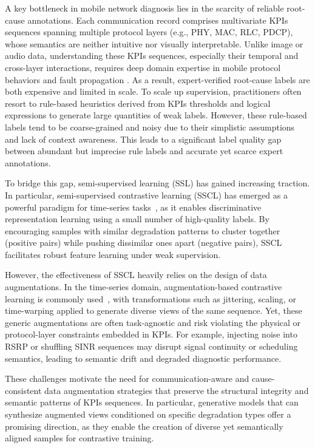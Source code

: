 \documentclass[lettersize,journal]{IEEEtran}
\begin{document}
A key bottleneck in mobile network diagnosis lies in the scarcity of reliable root-cause annotations. Each communication record comprises multivariate KPIs sequences spanning multiple protocol layers (e.g., PHY, MAC, RLC, PDCP), whose semantics are neither intuitive nor visually interpretable. Unlike image or audio data, understanding these KPIs sequences, especially their temporal and cross-layer interactions, requires deep domain expertise in mobile protocol behaviors and fault propagation \cite{chen2024overview}. As a result, expert-verified root-cause labels are both expensive and limited in scale.
To scale up supervision, practitioners often resort to rule-based heuristics derived from KPIs thresholds and logical expressions to generate large quantities of weak labels. However, these rule-based labels tend to be coarse-grained and noisy due to their simplistic assumptions and lack of context awareness. This leads to a significant label quality gap between abundant but imprecise rule labels and accurate yet scarce expert annotations.

To bridge this gap, semi-supervised learning (SSL) has gained increasing traction. In particular, semi-supervised contrastive learning (SSCL) has emerged as a powerful paradigm for time-series tasks~\cite{zhang2024self}, as it enables discriminative representation learning using a small number of high-quality labels. By encouraging samples with similar degradation patterns to cluster together (positive pairs) while pushing dissimilar ones apart (negative pairs), SSCL facilitates robust feature learning under weak supervision.

However, the effectiveness of SSCL heavily relies on the design of data augmentations. In the time-series domain, augmentation-based contrastive learning is commonly used~\cite{wen2020time, peng2021fault, luo2023time}, with transformations such as jittering, scaling, or time-warping applied to generate diverse views of the same sequence. Yet, these generic augmentations are often task-agnostic and risk violating the physical or protocol-layer constraints embedded in KPIs. For example, injecting noise into RSRP or shuffling SINR sequences may disrupt signal continuity or scheduling semantics, leading to semantic drift and degraded diagnostic performance.

These challenges motivate the need for communication-aware and cause-consistent data augmentation strategies that preserve the structural integrity and semantic patterns of KPIs sequences. In particular, generative models that can synthesize augmented views conditioned on specific degradation types offer a promising direction, as they enable the creation of diverse yet semantically aligned samples for contrastive training.
\end{document}
